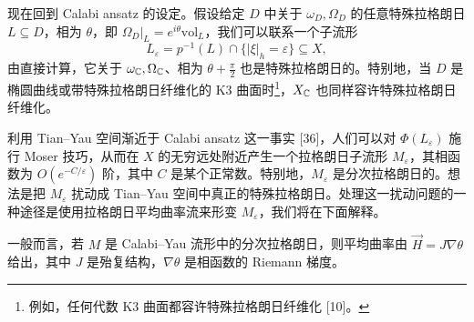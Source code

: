 现在回到 Calabi ansatz 的设定。假设给定 $D$ 中关于 $\omega_D,\Omega_D$ 的任意特殊拉格朗日 $L\subseteq D$，相为 $\theta$，即 $\Omega_D|_L=e^{i\theta}\mathrm{vol}_L$，我们可以联系一个子流形
\[
L_\varepsilon=p^{-1}(L)\cap\{|\xi|_h=\varepsilon\}\subseteq X,
\]
由直接计算，它关于 $\omega_{\mathbb{C}},\Omega_{\mathbb{C}}$、相为 $\theta+\frac{\pi}{2}$ 也是特殊拉格朗日的。特别地，当 $D$ 是椭圆曲线或带特殊拉格朗日纤维化的 K3 曲面时\footnote{例如，任何代数 K3 曲面都容许特殊拉格朗日纤维化 [10]。}，$X_{\mathbb{C}}$ 也同样容许特殊拉格朗日纤维化。

利用 Tian--Yau 空间渐近于 Calabi ansatz 这一事实 [36]，人们可以对 $\Phi(L_\varepsilon)$ 施行 Moser 技巧，从而在 $X$ 的无穷远处附近产生一个拉格朗日子流形 $M_\varepsilon$，其相函数为 $O(e^{-C/\varepsilon})$ 阶，其中 $C$ 是某个正常数。特别地，$M_\varepsilon$ 是分次拉格朗日的。想法是把 $M_\varepsilon$ 扰动成 Tian--Yau 空间中真正的特殊拉格朗日。处理这一扰动问题的一种途径是使用拉格朗日平均曲率流来形变 $M_\varepsilon$，我们将在下面解释。

一般而言，若 $M$ 是 Calabi--Yau 流形中的分次拉格朗日，则平均曲率由 $\vec H=J\nabla\theta$ 给出，其中 $J$ 是殆复结构，$\nabla\theta$ 是相函数的 Riemann 梯度。
